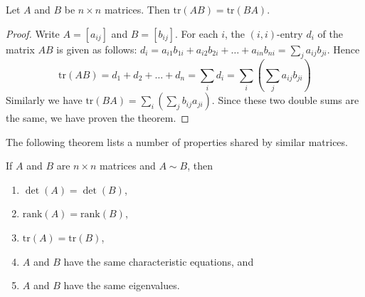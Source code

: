 \documentclass{ximera}
\begin{document}
\begin{theorem}\label{th:trAB=trBA}
Let $A$ and $B$ be $n \times n$ matrices. Then $\mbox{tr}(AB) = \mbox{tr}(BA)$.
\end{theorem}

\begin{proof}
Write $A = [a_{ij}]$ and $B = [b_{ij}]$. For each $i$, the $(i, i)$-entry $d_{i}$ of the matrix $AB$ is given as follows: $d_{i} = a_{i1}b_{1i} + a_{i2}b_{2i} + \dots + a_{in}b_{ni} = \sum_{j}a_{ij}b_{ji}$. Hence
\begin{equation*}
\mbox{tr}(AB) = d_1 + d_2 + \dots + d_n = \sum_{i}d_i = \sum_{i}\left(\sum_{j}a_{ij}b_{ji}\right)
\end{equation*}
Similarly we have $\mbox{tr}(BA) = \sum_{i}\left(\sum_{j}b_{ij}a_{ji}\right)$. Since these two double sums are the same, we have proven the theorem.
\end{proof}

The following theorem lists a number of properties shared by similar matrices.

\begin{theorem}\label{th:properties_similar}
If $A$ and $B$ are $n\times n$ matrices and $A\sim B$, then
\begin{enumerate}
\item\label{th:properties_similar_det} $\det(A) = \det(B)$,
\item\label{th:properties_similar_rank} $\mbox{rank}(A) = \mbox{rank}(B)$,
\item\label{th:properties_similar_trace} $\mbox{tr}(A)= \mbox{tr}(B)$,
\item\label{th:properties_similar_char_poly} $A$ and $B$ have the same characteristic equations, and
\item\label{th:properties_similar_eig} $A$ and $B$ have the same eigenvalues.
\end{enumerate}
\end{theorem}
\end{document}
